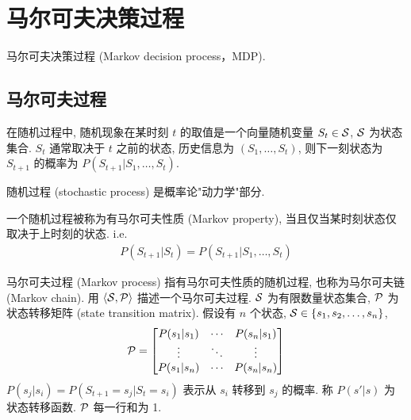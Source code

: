\newpage
\section{马尔可夫决策过程}

马尔可夫决策过程 (Markov decision process，MDP). 

\subsection{马尔可夫过程}


\begin{definition}[随机过程]
    在随机过程中, 随机现象在某时刻 $t$ 的取值是一个向量随机变量 $S_t \in \mathcal{S}$, $\mathcal{S}$ 为状态集合. $S_t$ 通常取决于 $t$ 之前的状态, 历史信息为 $(S_1, \dots, S_t)$, 则下一刻状态为 $S_{t+1}$ 的概率为 $P(S_{t+1}| S_1,\dots, S_t)$.
\end{definition}
随机过程 (stochastic process) 是概率论"动力学"部分. 

\begin{definition}[马尔可夫性质]
    一个随机过程被称为有马尔可夫性质 (Markov property), 当且仅当某时刻状态仅取决于上时刻的状态. i.e. 
    \begin{align*}
        P(S_{t+1}|S_t) = P(S_{t+1}| S_1,\dots, S_t)
    \end{align*}
\end{definition}

\begin{definition}[马尔可夫过程]
    马尔可夫过程 (Markov process) 指有马尔可夫性质的随机过程, 也称为马尔可夫链 (Markov chain). 用 $\braket{\mathcal{S}, \mathcal{P}}$ 描述一个马尔可夫过程. $\mathcal{S}$ 为有限数量状态集合, $\mathcal{P}$ 为状态转移矩阵 (state transition matrix). 假设有 $n$ 个状态, $\mathcal{S}\in\{ s_1, s_2, \dots ,s_n \}$, 
    \begin{align*}
        \mathcal{P}=\begin{bmatrix}
            P(s_1|s_1) & \cdots & P(s_n|s_1)\\
            \vdots & \ddots  & \vdots  \\
            P(s_1|s_n) & \cdots & P(s_n|s_n)
        \end{bmatrix}
    \end{align*}
    $P(s_j|s_i)=P(S_{t+1}=s_j|S_t=s_i)$ 表示从 $s_i$ 转移到 $s_j$ 的概率. 称 $P(s'|s)$ 为状态转移函数. $\mathcal{P}$ 每一行和为 1. 
\end{definition}


